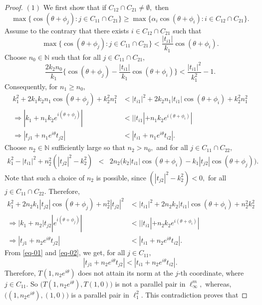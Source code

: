 \documentclass{amsart}
\theoremstyle{definition}
\theoremstyle{remark}
\numberwithin{equation}{section}
\begin{document}
\begin{proof}
	
$(1)$  We first show that if $C_{12}\cap C_{21}\neq \emptyset,$ then $$\max\{\cos(\theta+\phi_j):j\in C_{11}\cap C_{21} \}
\geq \max\Big\{\alpha_i\cos(\theta+\phi_i): i\in C_{12}\cap C_{21}\Big\}.$$ 
Assume to the contrary that there exists $i\in C_{12}\cap C_{21}$ such that 
\[\max\{\cos(\theta+\phi_j):j\in C_{11}\cap C_{21} \}<\frac{|t_{i1}|}{k_1}\cos(\theta+\phi_i).\]	
Choose $n_0\in \mathbb{N}$ such that for all $j\in C_{11}\cap C_{21},$
\[\frac{2k_2n_0}{k_1}\Big\{\cos(\theta+\phi_j)-\frac{|t_{i1}|}{k_1}\cos(\theta+\phi_i)\Big\}<\frac{|t_{i1}|^2}{k_1^2}-1.\]
Consequently, for  $n_1\geq n_0,$
\begin{equation}\label{eq-01}
	\begin{aligned}
k_1^2+2k_1k_2n_1\cos(\theta+\phi_j)+k_2^2n_1^2&<|t_{i1}|^2+2	k_2n_1|t_{i1}|\cos(\theta+\phi_i)+k_2^2n_1^2\\
\Rightarrow|k_1+n_1k_2e^{i(\theta+\phi_j)}|&<||t_{i1}|+n_1k_2e^{i(\theta+\phi_i)}|\\
\Rightarrow|t_{j1}+n_1e^{i\theta}t_{j2}|&<|t_{i1}+n_1e^{i\theta}t_{i2}|.
\end{aligned}
\end{equation}
Choose 
$n_2\in \mathbb{N}$ sufficiently large so that $n_2>n_0,$ and for all $j\in C_{11}\cap C_{22},$
\begin{eqnarray*}
k_1^2-|t_{i1}|^2+n_2^2(|t_{j2}|^2-k_2^2)&<& 2n_2\Big(k_2	|t_{i1}|\cos(\theta+\phi_i)-k_1|t_{j2}|\cos(\theta+\phi_j)\Big).
\end{eqnarray*}
Note that such a choice of $n_2$ is possible, since $(|t_{j2}|^2-k_2^2)<0,$ for all $j\in C_{11}\cap C_{22}.$ Therefore, 
\begin{equation}\label{eq-02}
		\begin{split}
	k_1^2+2n_2k_1|t_{j2}|\cos(\theta+\phi_j)+n_2^2|t_{j2}|^2&< |t_{i1}|^2+2n_2k_2	|t_{i1}|\cos(\theta+\phi_i)+n_2^2k_2^2\\
	\Rightarrow |k_1+n_2|t_{j2}|e^{i(\theta+\phi_j)}|&<||t_{i1}|+n_2k_2e^{i(\theta+\phi_i)}|\\
	\Rightarrow|t_{j1}+n_2e^{i\theta}t_{j2}|&<|t_{i1}+n_2e^{i\theta}t_{i2}|.
	\end{split}
\end{equation}
From \eqref{eq-01} and \eqref{eq-02}, we get, for all $j\in C_{11},$
\[|t_{j1}+n_2e^{i\theta}t_{j2}|<|t_{i1}+n_2e^{i\theta}t_{i2}|.\]
Therefore, $T(1,n_2e^{i\theta})$ does not attain its norm at the $j$-th coordinate, where $j\in C_{11}.$  So $\Big(T(1,n_2e^{i\theta}),T(1,0)\Big)$ is not a parallel pair in $\ell_\infty^m,$ whereas, $\Big((1,n_2e^{i\theta}),(1,0)\Big)$ is a parallel pair in $\ell_1^2.$ This contradiction proves that 

\end{proof}
\end{document}
